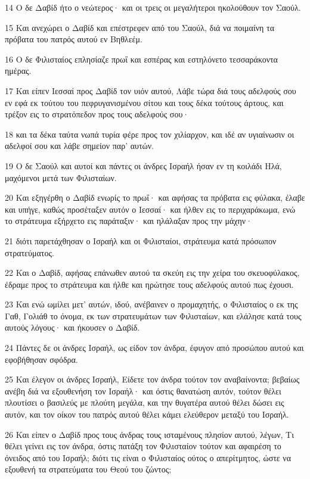 \par 14 Ο δε Δαβίδ ήτο ο νεώτερος· και οι τρεις οι μεγαλήτεροι ηκολούθουν τον Σαούλ.
\par 15 Και ανεχώρει ο Δαβίδ και επέστρεφεν από του Σαούλ, διά να ποιμαίνη τα πρόβατα του πατρός αυτού εν Βηθλεέμ.
\par 16 Ο δε Φιλισταίος επλησίαζε πρωΐ και εσπέρας και εστηλόνετο τεσσαράκοντα ημέρας.
\par 17 Και είπεν Ιεσσαί προς Δαβίδ τον υιόν αυτού, Λάβε τώρα διά τους αδελφούς σου εν εφά εκ τούτου του πεφρυγανισμένου σίτου και τους δέκα τούτους άρτους, και τρέξον εις το στρατόπεδον προς τους αδελφούς σου·
\par 18 και τα δέκα ταύτα νωπά τυρία φέρε προς τον χιλίαρχον, και ιδέ αν υγιαίνωσιν οι αδελφοί σου και λάβε σημείον παρ' αυτών.
\par 19 Ο δε Σαούλ και αυτοί και πάντες οι άνδρες Ισραήλ ήσαν εν τη κοιλάδι Ηλά, μαχόμενοι μετά των Φιλισταίων.
\par 20 Και εξηγέρθη ο Δαβίδ ενωρίς το πρωΐ· και αφήσας τα πρόβατα εις φύλακα, έλαβε και υπήγε, καθώς προσέταξεν αυτόν ο Ιεσσαί· και ήλθεν εις το περιχαράκωμα, ενώ το στράτευμα εξήρχετο εις παράταξιν· και ηλάλαξαν προς την μάχην·
\par 21 διότι παρετάχθησαν ο Ισραήλ και οι Φιλισταίοι, στράτευμα κατά πρόσωπον στρατεύματος.
\par 22 Και ο Δαβίδ, αφήσας επάνωθεν αυτού τα σκεύη εις την χείρα του σκευοφύλακος, έδραμε προς το στράτευμα και ήλθε και ηρώτησε τους αδελφούς αυτού πως έχουσι.
\par 23 Και ενώ ωμίλει μετ' αυτών, ιδού, ανέβαινεν ο προμαχητής, ο Φιλισταίος ο εκ της Γαθ, Γολιάθ το όνομα, εκ των στρατευμάτων των Φιλισταίων, και ελάλησε κατά τους αυτούς λόγους· και ήκουσεν ο Δαβίδ.
\par 24 Πάντες δε οι άνδρες Ισραήλ, ως είδον τον άνδρα, έφυγον από προσώπου αυτού και εφοβήθησαν σφόδρα.
\par 25 Και έλεγον οι άνδρες Ισραήλ, Είδετε τον άνδρα τούτον τον αναβαίνοντα; βεβαίως ανέβη διά να εξουθενήση τον Ισραήλ· και όστις θανατώση αυτόν, τούτον θέλει πλουτίσει ο βασιλεύς με πλούτη μεγάλα, και την θυγατέρα αυτού θέλει δώσει εις αυτόν, και τον οίκον του πατρός αυτού θέλει κάμει ελεύθερον μεταξύ του Ισραήλ.
\par 26 Και είπεν ο Δαβίδ προς τους άνδρας τους ισταμένους πλησίον αυτού, λέγων, Τι θέλει γείνει εις τον άνδρα, όστις πατάξη τον Φιλισταίον τούτον και αφαιρέση το όνειδος από του Ισραήλ; διότι τις είναι ο Φιλισταίος ούτος ο απερίτμητος, ώστε να εξουθενή τα στρατεύματα του Θεού του ζώντος;
